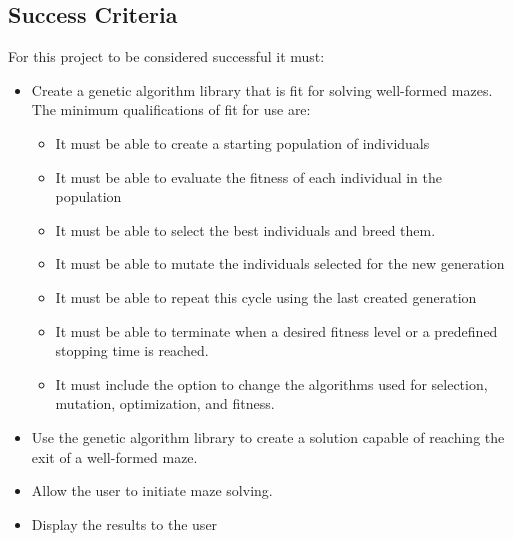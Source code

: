 \documentclass[letterpaper, 12pt]{article}
\begin{document}
  \subsection{Success Criteria}
	 For this project to be considered successful it must:
	 \begin{itemize}
		\item Create a genetic algorithm library that is fit for solving well-formed mazes.\\The minimum qualifications of fit for use are:
		  \begin{itemize}
			 \item It must be able to create a starting population of individuals
			 \item It must be able to evaluate the fitness of each individual in the population
			 \item It must be able to select the best individuals and breed them.
			 \item It must be able to mutate the individuals selected for the new generation
			 \item It must be able to repeat this cycle using the last created generation
			 \item It must be able to terminate when a desired fitness level or a predefined stopping time is reached.  
			 \item It must include the option to change the algorithms used for selection, mutation, optimization, and fitness.
		  \end{itemize}
		\item Use the genetic algorithm library to create a solution capable of reaching the exit of a well-formed maze.
		\item Allow the user to initiate maze solving.
		\item Display the results to the user
	 \end{itemize}
\end{document}
